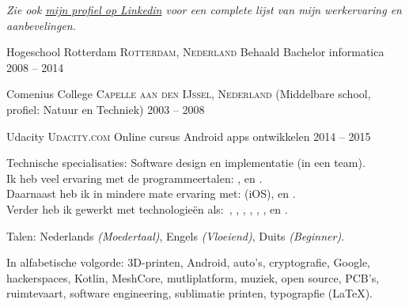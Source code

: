\documentclass[10pt,a4paper]{article}
\begin{document}
\begin{center}
  \emph{Zie ook \href{http://www.linkedin.com/in/frankkie12345}{mijn profiel op Linkedin} voor een complete lijst van mijn werkervaring en aanbevelingen.}
\end{center}


\spacedhrule{-0.2em}{-0.4em}


\headedsection
  {Hogeschool Rotterdam}
  {\textsc{Rotterdam, Nederland}} {%
  \headedsubsection
    {Behaald Bachelor informatica}
    {2008 -- 2014}
    {}
}

\headedsection
  {Comenius College}
  {\textsc{Capelle aan den IJssel, Nederland}} {%
  \headedsubsection
    { \textnormal{(Middelbare school, profiel: Natuur en Techniek)}}
    {2003 -- 2008} {}
}

\headedsection
  {Udacity}
  {\textsc{Udacity.com}} {
  \headedsection
  { \textnormal{Online cursus Android apps ontwikkelen}}
  {2014 -- 2015} 
  {}
  }

\spacedhrule{0.5em}{-0.4em}


\inlineheadsection  %
  {Technische specialisaties:}
  {Software design en implementatie (in een team). \\
  Ik heb veel ervaring met de programmeertalen: ,  en . \\
  Daarnaast heb ik in mindere mate ervaring met:  (iOS),  en . \\
  Verder heb ik gewerkt met technologie\"en als:\ , , , , , , en .}

\inlineheadsection
  {Talen:}
  {Nederlands \emph{(Moedertaal)}, Engels \emph{(Vloeiend)}, Duits \emph{(Beginner)}.}


\spacedhrule{1.6em}{-0.4em}


\inlineheadsection
  {In alfabetische volgorde:}
  {3D-printen, Android, auto's, cryptografie, Google, hackerspaces, Kotlin, MeshCore, mutliplatform, muziek, open source, PCB's, ruimtevaart, software engineering, sublimatie printen, typograpfie (\LaTeX).}
\end{document}
